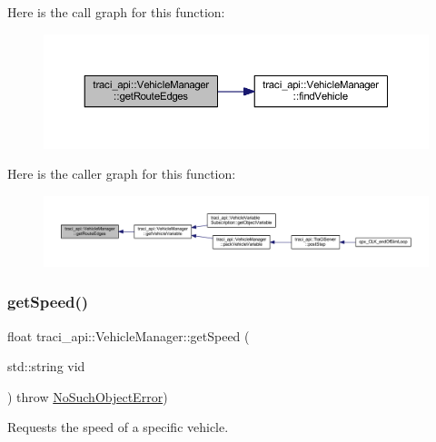 Here is the call graph for this function\+:\nopagebreak
\begin{figure}[H]
\begin{center}
\leavevmode
\includegraphics[width=350pt]{classtraci__api_1_1_vehicle_manager_a399053f44944093adf9a00536bf86bba_cgraph}
\end{center}
\end{figure}
Here is the caller graph for this function\+:\nopagebreak
\begin{figure}[H]
\begin{center}
\leavevmode
\includegraphics[width=350pt]{classtraci__api_1_1_vehicle_manager_a399053f44944093adf9a00536bf86bba_icgraph}
\end{center}
\end{figure}
\mbox{\label{classtraci__api_1_1_vehicle_manager_aa5f5a8c13bdd6b1407da5b5ffb6a8559}} 
\subsubsection{\texorpdfstring{get\+Speed()}{getSpeed()}}
{\footnotesize\ttfamily float traci\+\_\+api\+::\+Vehicle\+Manager\+::get\+Speed (\begin{DoxyParamCaption}\item[{std\+::string}]{vid }\end{DoxyParamCaption}) throw  \hyperlink{classtraci__api_1_1_no_such_object_error}{No\+Such\+Object\+Error}) }



Requests the speed of a specific vehicle. 


